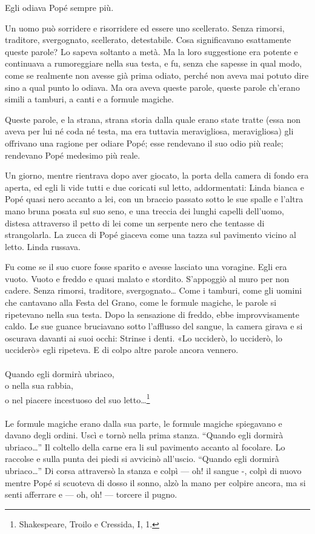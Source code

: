 \documentclass[
a5paper, %
10pt, %
twoside, 
onecolumn, %
openany, %
]{memoir}
\begin{document}
Egli odiava Popé sempre più.

Un uomo può sorridere e risorridere ed essere uno scellerato. Senza rimorsi, traditore, svergognato, scellerato, detestabile. Cosa significavano esattamente queste parole? Lo sapeva soltanto a metà. Ma la loro suggestione era potente e continuava a rumoreggiare nella sua testa, e fu, senza che sapesse in qual modo, come se realmente non avesse già prima odiato, perché non aveva mai potuto dire sino a qual punto lo odiava. Ma ora aveva queste parole, queste parole ch’erano simili a tamburi, a canti e a formule magiche.

Queste parole, e la strana, strana storia dalla quale erano state tratte (essa non aveva per lui né coda né testa, ma era tuttavia meravigliosa, meravigliosa) gli offrivano una ragione per odiare Popé; esse rendevano il suo odio più reale; rendevano Popé medesimo più reale.

Un giorno, mentre rientrava dopo aver giocato, la porta della camera di fondo era aperta, ed egli li vide tutti e due coricati sul letto, addormentati: Linda bianca e Popé quasi nero accanto a lei, con un braccio passato sotto le sue spalle e l’altra mano bruna posata sul suo seno, e una treccia dei lunghi capelli dell’uomo, distesa attraverso il petto di lei come un serpente nero che tentasse di strangolarla. La zucca di Popé giaceva come una tazza sul pavimento vicino al letto. Linda russava.

Fu come se il suo cuore fosse sparito e avesse lasciato una voragine. Egli era vuoto. Vuoto e freddo e quasi malato e stordito. S’appoggiò al muro per non cadere. Senza rimorsi, traditore, svergognato… Come i tamburi, come gli uomini che cantavano alla Festa del Grano, come le formule magiche, le parole si ripetevano nella sua testa. Dopo la sensazione di freddo, ebbe improvvisamente caldo. Le sue guance bruciavano sotto l’afflusso del sangue, la camera girava e si oscurava davanti ai suoi occhi: Strinse i denti. «Lo ucciderò, lo ucciderò, lo ucciderò» egli ripeteva. E di colpo altre parole ancora vennero.
\leavevmode\\\leavevmode\\
{\tiny Quando egli dormirà ubriaco,\\
o nella sua rabbia,\\
o nel piacere incestuoso del suo letto…}\footnote{Shakespeare, Troilo e Cressida, I, 1.}
\leavevmode\\\leavevmode\\
Le formule magiche erano dalla sua parte, le formule magiche spiegavano e davano degli ordini. Uscì e tornò nella prima stanza. “Quando egli dormirà ubriaco…” Il coltello della carne era li sul pavimento accanto al focolare. Lo raccolse e sulla punta dei piedi si avvicinò all’uscio. “Quando egli dormirà ubriaco…” Di corsa attraversò la stanza e colpì — oh! il sangue -, colpì di nuovo mentre Popé si scuoteva di dosso il sonno, alzò la mano per colpire ancora, ma si senti afferrare e — oh, oh! — torcere il pugno.
\end{document}
